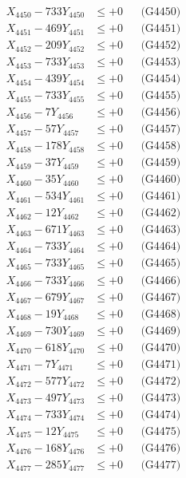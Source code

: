 \documentclass[a4paper,10pt]{article}
\begin{document}
{\begin{align}
X_{4450} - 733Y_{4450} &\leq +0 && \text{(G4450)} \\
\allowbreak
X_{4451} - 469Y_{4451} &\leq +0 && \text{(G4451)} \\
X_{4452} - 209Y_{4452} &\leq +0 && \text{(G4452)} \\
X_{4453} - 733Y_{4453} &\leq +0 && \text{(G4453)} \\
X_{4454} - 439Y_{4454} &\leq +0 && \text{(G4454)} \\
X_{4455} - 733Y_{4455} &\leq +0 && \text{(G4455)} \\
X_{4456} - 7Y_{4456} &\leq +0 && \text{(G4456)} \\
X_{4457} - 57Y_{4457} &\leq +0 && \text{(G4457)} \\
X_{4458} - 178Y_{4458} &\leq +0 && \text{(G4458)} \\
X_{4459} - 37Y_{4459} &\leq +0 && \text{(G4459)} \\
X_{4460} - 35Y_{4460} &\leq +0 && \text{(G4460)} \\
\allowbreak
X_{4461} - 534Y_{4461} &\leq +0 && \text{(G4461)} \\
X_{4462} - 12Y_{4462} &\leq +0 && \text{(G4462)} \\
X_{4463} - 671Y_{4463} &\leq +0 && \text{(G4463)} \\
X_{4464} - 733Y_{4464} &\leq +0 && \text{(G4464)} \\
X_{4465} - 733Y_{4465} &\leq +0 && \text{(G4465)} \\
X_{4466} - 733Y_{4466} &\leq +0 && \text{(G4466)} \\
X_{4467} - 679Y_{4467} &\leq +0 && \text{(G4467)} \\
X_{4468} - 19Y_{4468} &\leq +0 && \text{(G4468)} \\
X_{4469} - 730Y_{4469} &\leq +0 && \text{(G4469)} \\
X_{4470} - 618Y_{4470} &\leq +0 && \text{(G4470)} \\
\allowbreak
X_{4471} - 7Y_{4471} &\leq +0 && \text{(G4471)} \\
X_{4472} - 577Y_{4472} &\leq +0 && \text{(G4472)} \\
X_{4473} - 497Y_{4473} &\leq +0 && \text{(G4473)} \\
X_{4474} - 733Y_{4474} &\leq +0 && \text{(G4474)} \\
X_{4475} - 12Y_{4475} &\leq +0 && \text{(G4475)} \\
X_{4476} - 168Y_{4476} &\leq +0 && \text{(G4476)} \\
X_{4477} - 285Y_{4477} &\leq +0 && \text{(G4477)} \\

\end{align}}
\end{document}

